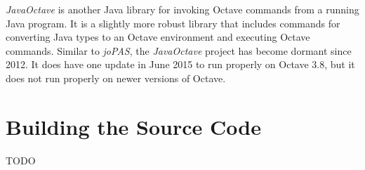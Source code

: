 \documentclass{memoir}
\begin{document}
\textit{JavaOctave} is another Java library for invoking Octave
commands from a running Java program.  It is a slightly more robust
library that includes commands for converting Java types to an Octave
environment and executing Octave commands.  Similar to \textit{joPAS},
the \textit{JavaOctave} project has become dormant since 2012.  It
does have one update in June 2015 to run properly on Octave 3.8, but
it does not run properly on newer versions of Octave.

\chapter{Building the Source Code}
\label{chap:source}

TODO



\end{document}
